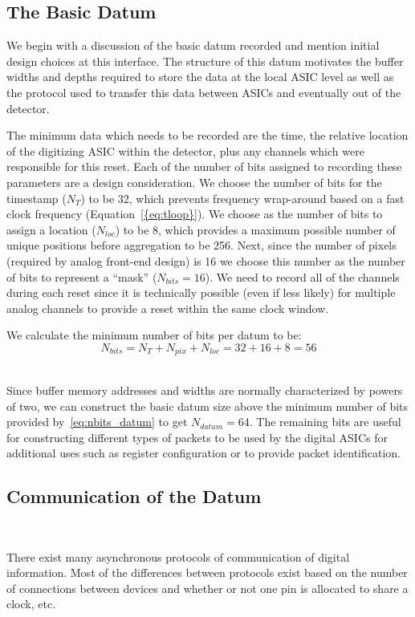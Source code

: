 \subsection{The Basic Datum}

We begin with a discussion of the basic datum recorded and mention initial design choices at this interface.
The structure of this datum motivates the buffer widths and depths required to store the data at the local ASIC level as well as the protocol used to transfer this data between ASICs and eventually out of the detector.

The minimum data which needs to be recorded are the time, the relative location of the digitizing ASIC within the detector, plus any channels which were responsible for this reset.
Each of the number of bits assigned to recording these parameters are a design consideration.
We choose the number of bits for the timestamp ($N_{T}$) to be 32, which prevents frequency wrap-around based on a fast clock frequency (Equation~\ref{{eq:tloop}}).
We choose as the number of bits to assign a location ($N_{loc}$) to be 8, which provides a maximum possible number of unique positions before aggregation to be 256.
Next, since the number of pixels (required by analog front-end design) is 16 we choose this number as the number of bits to represent a ``mask'' ($N_{bits} = 16$).
We need to record all of the channels during each reset since it is technically possible (even if less likely) for multiple analog channels to provide a reset within the same clock window.

We calculate the minimum number of bits per datum to be:
\begin{equation}
  N_{bits} = N_{T} + N_{pix} + N_{loc} = 32 + 16 + 8 = 56
\end{equation}~\label{eq:nbits_datum}

Since buffer memory addresses and widths are normally characterized by powers of two, we can construct the basic datum size above the minimum number of bits provided by~\ref{eq:nbits_datum} to get $N_{datum} = 64$.
The remaining bits are useful for constructing different types of packets to be used by the digital ASICs for additional uses such as register configuration or to provide packet identification.

\subsection{Communication of the Datum}~\label{sec:comms}

There exist many asynchronous protocols of communication of digital information.
Most of the differences between protocols exist based on the number of connections between devices and whether or not one pin is allocated to share a clock, etc.

